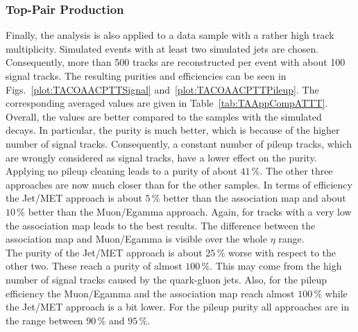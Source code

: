 \subsubsection{Top-Pair Production \label{sec:TASEFRDACPTT}}
Finally, the analysis is also applied to a data sample with a rather high track multiplicity. Simulated \ttbar events with at least two simulated jets are chosen. Consequently, more than 500 tracks are reconstructed per event with about 100 signal tracks. The resulting purities and efficiencies can be seen in Figs.~\ref{plot:TACOAACPTTSignal} and~\ref{plot:TACOAACPTTPileup}. The corresponding averaged values are given in Table~\ref{tab:TAAppCompATTT}. Overall, the values are better compared to the samples with the simulated \Zz decays. In particular, the purity is much better, which is because of the higher number of signal tracks. Consequently, a constant number of pileup tracks, which are wrongly considered as signal tracks, have a lower effect on the purity. Applying no pileup cleaning leads to a purity of about $41\,\%$. The other three approaches are now much closer than for the other samples. In terms of efficiency the Jet/MET approach is about $5\,\%$ better than the association map and about $10\,\%$ better than the Muon/Egamma approach. Again, for tracks with a very low \pt the association map leads to the best results. The difference between the association map and Muon/Egamma is visible over the whole $\eta$ range. \\
The purity of the Jet/MET approach is about $25\,\%$ worse with respect to the other two. These reach a purity of almost $100\,\%$. This may come from the high number of signal tracks caused by the quark-gluon jets. Also, for the pileup efficiency the Muon/Egamma and the association map reach almost $100\,\%$ while the Jet/MET approach is a bit lower. For the pileup purity all approaches are in the range between $90\,\%$ and $95\,\%$.

